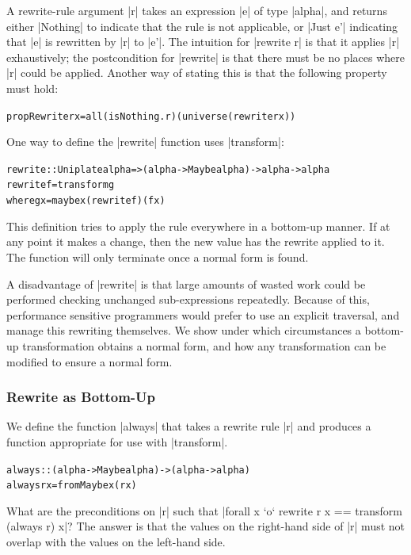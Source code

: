 \documentclass[preprint]{sigplanconf}
\newenvironment{code}{\begin{alltt}\small}{\end{alltt}}
\newcommand{\ignore}{}
\begin{document}
A rewrite-rule argument |r| takes an expression |e| of type |alpha|, and returns either |Nothing| to indicate that the rule is not applicable, or |Just e'| indicating that |e| is rewritten by |r| to |e'|. The intuition for |rewrite r| is that it applies |r| exhaustively; the postcondition for |rewrite| is that there must be no places where |r| could be applied. Another way of stating this is that the following property must hold:

\begin{code}
propRewrite r x = all (isNothing . r) (universe (rewrite r x))
\end{code}

One way to define the |rewrite| function uses |transform|:

\begin{code}
rewrite :: Uniplate alpha => (alpha -> Maybe alpha) -> alpha -> alpha
rewrite f = transform g
    where g x = maybe x (rewrite f) (f x)
\end{code}

This definition tries to apply the rule everywhere in a bottom-up manner. If at any point it makes a change, then the new value has the rewrite applied to it. The function will only terminate once a normal form is found.

A disadvantage of |rewrite| is that large amounts of wasted work could be performed checking unchanged sub-expressions repeatedly. Because of this, performance sensitive programmers would prefer to use an explicit traversal, and manage this rewriting themselves. We show under which circumstances a bottom-up transformation obtains a normal form, and how any transformation can be modified to ensure a normal form.

\subsubsection{Rewrite as Bottom-Up}
\label{sec:rewrite_bottom}

We define the function |always| that takes a rewrite rule |r| and produces a function appropriate for use with |transform|.

\begin{code}
always :: (alpha -> Maybe alpha) -> (alpha -> alpha)
always r x = fromMaybe x (r x)
\end{code}

What are the preconditions on |r| such that \ignore|forall x `o` rewrite r x == transform (always r) x|? The answer is that the values on the right-hand side of |r| must not overlap with the values on the left-hand side.
\end{document}
